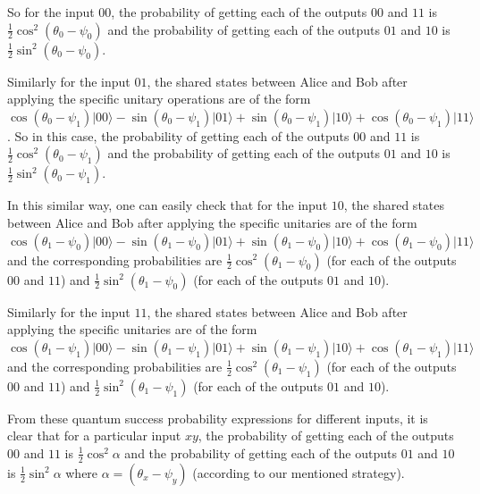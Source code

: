 \documentclass[]{svjour3}
\begin{document}
So for the input $00$, the probability of getting each of the outputs $00$ and $11$ is $\frac{1}{2}\cos^2(\theta_0-\psi_0)$ and the probability of getting each of the outputs $01$ and $10$ is $\frac{1}{2}\sin^2(\theta_0-\psi_0)$.

Similarly for the input $01$, the shared states between Alice and Bob after applying the specific unitary operations are of the form $\cos(\theta_0-\psi_1)\vert 00 \rangle  - \sin(\theta_0-\psi_1)\vert 01 \rangle  + \sin(\theta_0-\psi_1)\vert 10 \rangle  + \cos(\theta_0-\psi_1)\vert 11 \rangle $. So in this case, the probability of getting each of the outputs $00$ and $11$ is $\frac{1}{2}\cos^2(\theta_0-\psi_1)$ and the probability of getting each of the outputs $01$ and $10$ is $\frac{1}{2}\sin^2(\theta_0-\psi_1)$.

In this similar way, one can easily check that for the input $10$, the shared states between Alice and Bob after applying the specific unitaries are of the form $\cos(\theta_1-\psi_0)\vert 00 \rangle  - \sin(\theta_1-\psi_0)\vert 01 \rangle  + \sin(\theta_1-\psi_0)\vert 10 \rangle  + \cos(\theta_1-\psi_0)\vert 11 \rangle $ and the corresponding probabilities are $\frac{1}{2}\cos^2(\theta_1-\psi_0)$ (for each of the outputs $00$ and $11$) and $\frac{1}{2}\sin^2(\theta_1-\psi_0)$ (for each of the outputs $01$ and $10$).

Similarly for the input $11$, the shared states between Alice and Bob after applying the specific unitaries are of the form $\cos(\theta_1-\psi_1)\vert 00 \rangle  - \sin(\theta_1-\psi_1)\vert 01 \rangle  + \sin(\theta_1-\psi_1)\vert 10 \rangle  + \cos(\theta_1-\psi_1)\vert 11 \rangle $ and the corresponding probabilities are $\frac{1}{2}\cos^2(\theta_1-\psi_1)$ (for each of the outputs $00$ and $11$) and $\frac{1}{2}\sin^2(\theta_1-\psi_1)$ (for each of the outputs $01$ and $10$).

From these quantum success probability expressions for different inputs, it is clear that for a particular input $xy$, the probability of getting each of the outputs $00$ and $11$ is $\frac{1}{2}\cos^2\alpha$ and the probability of getting each of the outputs $01$ and $10$ is $\frac{1}{2}\sin^2\alpha$ where $\alpha = (\theta_x-\psi_y)$ (according to our mentioned strategy).
\end{document}
